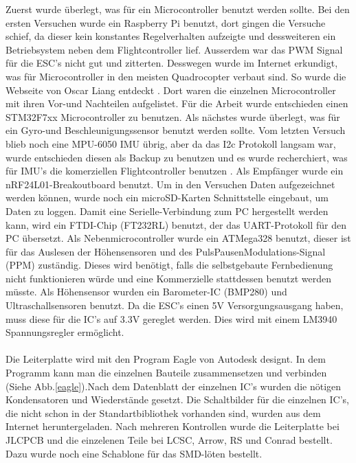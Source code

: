 \documentclass[12pt,a4paper, ngerman]{article}
\begin{document}
\fi
Zuerst wurde überlegt, was für ein Microcontroller benutzt werden sollte. Bei den ersten Versuchen wurde ein Raspberry Pi benutzt, dort gingen die Versuche schief, da dieser kein konstantes Regelverhalten aufzeigte und dessweiteren ein Betriebsystem neben dem Flightcontroller lief. Ausserdem war das PWM Signal für die ESC's nicht gut und zitterten. Desswegen wurde im Internet erkundigt, was für Microcontroller in den meisten Quadrocopter verbaut sind. So wurde die Webseite von Oscar Liang entdeckt \cite{website:OS_MCU_COLL}. Dort waren die einzelnen Microcontroller mit ihren Vor-und Nachteilen aufgelistet. Für die Arbeit wurde entschieden einen STM32F7xx Microcontroller zu benutzen. Als nächstes wurde überlegt, was für ein Gyro-und Beschleunigungssensor benutzt werden sollte. Vom letzten Versuch blieb noch eine MPU-6050 IMU übrig, aber da das I2c Protokoll langsam war, wurde entschieden diesen als Backup zu benutzen und es wurde recherchiert, was für IMU's die komerziellen Flightcontroller benutzen \cite{website:IMU_COLL}. Als Empfänger wurde ein nRF24L01-Breakoutboard benutzt. Um in den Versuchen Daten aufgezeichnet werden können, wurde noch ein microSD-Karten Schnittstelle eingebaut, um Daten zu loggen. Damit eine Serielle-Verbindung zum PC hergestellt werden kann, wird ein FTDI-Chip (FT232RL) benutzt, der das UART-Protokoll für den PC übersetzt. Als Nebenmicrocontroller wurde ein ATMega328 benutzt, dieser ist für das Auslesen der Höhensensoren und des PulsPausenModulations-Signal (PPM) zuständig. Dieses wird benötigt, falls die selbstgebaute Fernbedienung nicht funktionieren würde und eine Kommerzielle stattdessen benutzt werden müsste. Als Höhensensor wurden ein Barometer-IC (BMP280) und Ultraschallsensoren benutzt. Da die ESC's einen 5V Versorgungsausgang haben, muss diese für die IC's auf 3.3V gereglet werden. Dies wird mit einem LM3940 Spannungsregler ermöglicht. \\ \\ Die Leiterplatte wird mit den Program Eagle von Autodesk designt. In dem Programm kann man die einzelnen Bauteile zusammensetzen und verbinden (Siehe Abb.\ref{eagle}).Nach dem Datenblatt der einzelnen IC's wurden die nötigen Kondensatoren und Wiederstände gesetzt. Die Schaltbilder für die einzelnen IC's, die nicht schon in der Standartbibliothek vorhanden sind, wurden aus dem Internet heruntergeladen. Nach mehreren Kontrollen wurde die Leiterplatte bei JLCPCB und die einzelenen Teile bei LCSC, Arrow, RS und Conrad bestellt. Dazu wurde noch eine Schablone für das SMD-löten bestellt. 
\end{document}

